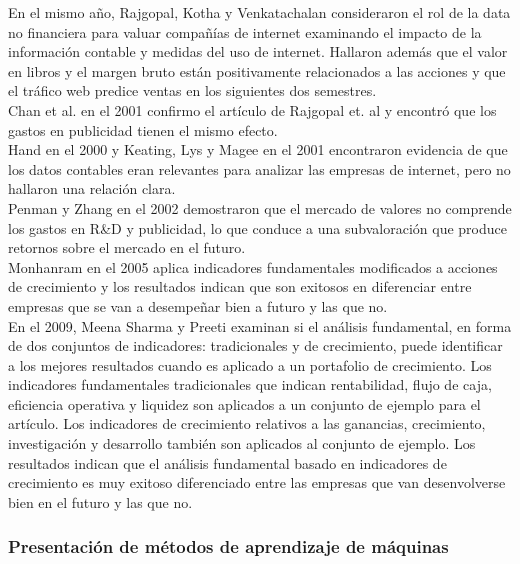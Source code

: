 En el mismo año, Rajgopal, Kotha y Venkatachalan \cite{Rajgopal2000} consideraron el rol de la data no financiera para valuar compañías de internet examinando el impacto de la información contable y medidas del uso de internet. Hallaron además que el valor en libros y el margen bruto están positivamente relacionados a las acciones y que el tráfico web predice ventas en los siguientes dos semestres.\\

Chan et al. \cite{Chan2001} en el 2001 confirmo el artículo de Rajgopal et. al \cite{Rajgopal2000} y encontró que los gastos en publicidad tienen el mismo efecto.\\

Hand \cite{Hand2000} en el 2000 y Keating, Lys y Magee en \cite{Keating2001} el 2001 encontraron evidencia de que los datos contables eran relevantes para analizar las empresas de internet, pero no hallaron una relación clara.\\

Penman y Zhang \cite{Penman2002} en el 2002 demostraron que el mercado de valores no comprende los gastos en R\&D y publicidad, lo que conduce a una subvaloración que produce retornos sobre el mercado en el futuro.\\

Monhanram \cite{Mohanram2005} en el 2005 aplica indicadores fundamentales modificados a acciones de crecimiento y los resultados indican que son exitosos en diferenciar entre empresas que se van a desempeñar bien a futuro y las que no.\\

En el 2009, Meena Sharma y Preeti \cite{Preeti2009} examinan si el análisis fundamental, en forma de dos conjuntos de indicadores: tradicionales y de crecimiento, puede identificar a los mejores resultados cuando es aplicado a un portafolio de crecimiento. Los indicadores fundamentales tradicionales  que indican rentabilidad, flujo de caja, eficiencia operativa y liquidez son aplicados a un conjunto de ejemplo para el artículo. Los indicadores de crecimiento relativos a las ganancias, crecimiento, investigación y desarrollo también son aplicados al conjunto de ejemplo. Los resultados indican que el análisis fundamental basado en indicadores de crecimiento es muy exitoso diferenciado entre las empresas que van desenvolverse bien en el futuro y las que no.\\


\subsubsection{Presentaci\'on de m\'etodos de aprendizaje de m\'aquinas}

